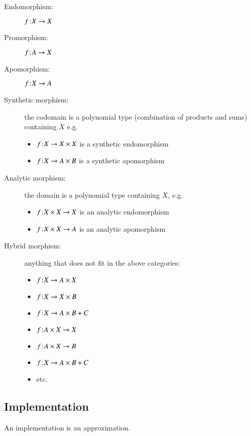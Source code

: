 \documentclass{article}
\begin{document}
\begin{description}
\item[Endomorphism\footnotemark:] \(f\hspace{1pt}\mathpunct{:}\hspace{-1pt}X\rightarrow X\)
\item[Promorphism\footnotemark:] \(f\hspace{1pt}\mathpunct{:}\hspace{-1pt}A\rightarrow X\)
\item[Apomorphism\footnotemark:] \(f\hspace{1pt}\mathpunct{:}\hspace{-1pt}X\rightarrow A\)
\item[Synthetic morphism:] the codomain is a polynomial type
  (combination of products and sums) containing \(X\) e.g.
  \begin{itemize}
  \item \(f\hspace{1pt}\mathpunct{:}\hspace{-1pt}X\rightarrow X\times X\) is a synthetic endomorphism
  \item \(f\hspace{1pt}\mathpunct{:}\hspace{-1pt}X\rightarrow A\times B\) is a synthetic apomorphism
  \end{itemize}
\item[Analytic morphism:] the domain is a polynomial type containing \(X\), e.g.
  \begin{itemize}
    \item \(f\hspace{1pt}\mathpunct{:}\hspace{-1pt}X\times X\rightarrow X\) is an analytic endomorphism
    \item \(f\hspace{1pt}\mathpunct{:}\hspace{-1pt}X\times X\rightarrow A\) is an analytic apomorphism
  \end{itemize}
\item[Hybrid morphism:] anything that does not fit in the above categories:
  \begin{itemize}
  \item \(f\hspace{1pt}\mathpunct{:}\hspace{-1pt}X\rightarrow A\times X\)
  \item \(f\hspace{1pt}\mathpunct{:}\hspace{-1pt}X\rightarrow X\times B\)
  \item \(f\hspace{1pt}\mathpunct{:}\hspace{-1pt}X\rightarrow A\times B + C\)
  \item \(f\hspace{1pt}\mathpunct{:}\hspace{-1pt}A\times X\rightarrow X\)
  \item \(f\hspace{1pt}\mathpunct{:}\hspace{-1pt}A\times X\rightarrow B\)
  \item \(f\hspace{1pt}\mathpunct{:}\hspace{-1pt}X\rightarrow A\times B + C\)
  \item etc.
  \end{itemize}
\end{description}


\subsection{Implementation}

An implementation is an approximation.
\end{document}
